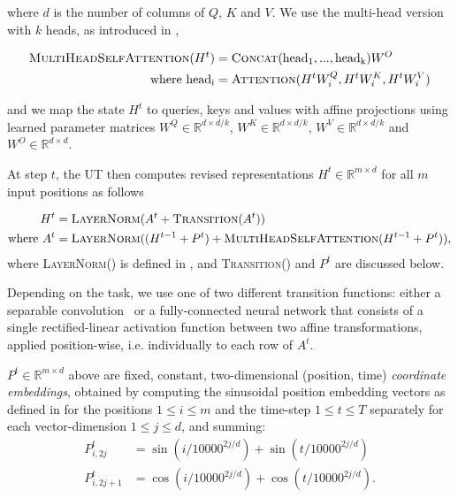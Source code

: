 where $d$ is the number of columns of $Q$, $K$ and $V$. We use the multi-head version with $k$ heads, as introduced in \citep{transformer},

\begin{align}
    \label{MultiheadSelfAttention}
    \textsc{MultiHeadSelfAttention}(H^t) &= \textsc{Concat}(\mathrm{head_1}, ..., \mathrm{head_k})W^O\\
    \text{where}~\mathrm{head_i} &= \textsc{Attention}(H^t W^Q_i, H^t W^K_i, H^t W^V_i)
\end{align}

and we map the state $H^t$ to queries, keys and values with affine projections using learned parameter matrices $W^Q \in \mathbb{R}^{d \times d/k}$, $W^K \in \mathbb{R}^{d \times d/k}$, $W^V \in \mathbb{R}^{d \times d/k}$ and $W^O \in \mathbb{R}^{d \times d}$.

At step $t$, the UT then computes revised representations $H^t \in \mathbb{R}^{m \times d}$ for all $m$ input positions as follows

\begin{align}
    \label{RecurrentTransition}
    H^t &= \textsc{LayerNorm}(A^{t} + \textsc{Transition}(A^t) ) \\
    \mathrm{where}~A^t &= \textsc{LayerNorm}((H^{t-1} + P^{t}) + \textsc{MultiHeadSelfAttention}(H^{t-1} + P^{t})),
\end{align}
where \textsc{LayerNorm()} is defined in \cite{layernorm2016}, and \textsc{Transition()} and $P^t$ are discussed below.

Depending on the task, we use one of two different transition functions: either a separable convolution~\citep{xception2016} or a fully-connected neural network that consists of a single rectified-linear activation function between two affine transformations, applied position-wise, i.e. individually to each row of $A^t$.

$P^t \in \mathbb{R}^{m \times d}$ above are fixed, constant, two-dimensional (position, time) \emph{coordinate embeddings}, obtained by computing the sinusoidal position embedding vectors as defined in \citep{transformer} for the positions $1 \leq i \leq m$ and the time-step $1 \leq t \leq T$ separately for each vector-dimension $1 \leq j \leq d$, and summing:
\begin{align}
\label{eqn:coordinate-embeddings}
    P^t_{i, 2j} &= \sin(i / 10000^{2j / d}) + \sin(t / 10000^{2j / d}) \\
    P^t_{i, 2j+1} &= \cos(i / 10000^{2j / d}) + \cos(t / 10000^{2j / d}).
\end{align}

